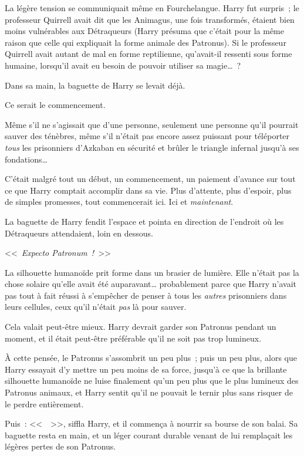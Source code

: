 La légère tension se communiquait même en Fourchelangue. Harry fut surpris~; le professeur Quirrell avait dit que les Animagus, une fois transformés, étaient bien moins vulnérables aux Détraqueurs (Harry présuma que c'était pour la même raison que celle qui expliquait la forme animale des Patronus). Si le professeur Quirrell avait autant de mal en forme reptilienne, qu'avait-il ressenti sous forme humaine, lorsqu'il avait eu besoin de pouvoir utiliser sa magie…~?

Dans sa main, la baguette de Harry se levait déjà.

Ce serait le commencement.

Même s'il ne s'agissait que d'une personne, seulement une personne qu'il pourrait sauver des ténèbres, même s'il n'était pas encore assez puissant pour téléporter \emph{tous} les prisonniers d'Azkaban en sécurité et brûler le triangle infernal jusqu'à ses fondations…

C'était malgré tout un début, un commencement, un paiement d'avance sur tout ce que Harry comptait accomplir dans sa vie. Plus d'attente, plus d'espoir, plus de simples promesses, tout commencerait ici. Ici et \emph{maintenant}.

La baguette de Harry fendit l'espace et pointa en direction de l'endroit où les Détraqueurs attendaient, loin en dessous.

<<~\emph{Expecto Patronum~!}~>>

La silhouette humanoïde prit forme dans un brasier de lumière. Elle n'était pas la chose solaire qu'elle avait été auparavant… probablement parce que Harry n'avait pas tout à fait réussi à s'empêcher de penser à tous les \emph{autres} prisonniers dans leurs cellules, ceux qu'il n'était \emph{pas} là pour sauver.

Cela valait peut-être mieux. Harry devrait garder son Patronus pendant un moment, et il était peut-être préférable qu'il ne soit pas trop lumineux.

À cette pensée, le Patronus s'assombrit un peu plus~; puis un peu plus, alors que Harry essayait d'y mettre un peu moins de sa force, jusqu'à ce que la brillante silhouette humanoïde ne luise finalement qu'un peu plus que le plus lumineux des Patronus animaux, et Harry sentit qu'il ne pouvait le ternir plus sans risquer de le perdre entièrement.

Puis~: <<~~>>, siffla Harry, et il commença à nourrir sa bourse de son balai. Sa baguette resta en main, et un léger courant durable venant de lui remplaçait les légères pertes de son Patronus.

